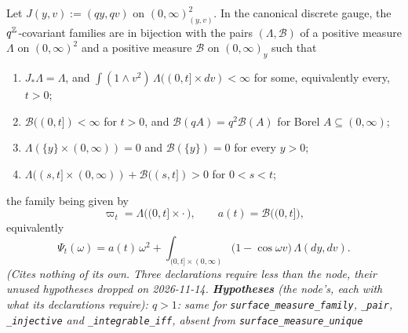 \begin{theorem}
\label{thm:surface-measure}
\leanok
{}
Let $J(y,v) := (qy, qv)$ on $(0,\infty)^2_{(y,v)}$. In the canonical discrete gauge, the
$q^{\mathbb{Z}}$-covariant families are in bijection with the pairs $(\Lambda, \mathcal{B})$ of a positive
measure $\Lambda$ on $(0,\infty)^2$ and a positive measure $\mathcal{B}$ on $(0,\infty)_y$ such that
\begin{enumerate}
\item[(i)] $J_*\Lambda = \Lambda$, and $\int(1 \wedge v^2)\,\Lambda((0,t] \times dv) < \infty$ for
some, equivalently every, $t > 0$;
\item[(ii)] $\mathcal{B}((0,t]) < \infty$ for $t > 0$, and $\mathcal{B}(qA) = q^2\mathcal{B}(A)$ for
Borel $A \subseteq (0,\infty)$;
\item[(iii)] $\Lambda(\{y\} \times (0,\infty)) = 0$ and $\mathcal{B}(\{y\}) = 0$ for every $y > 0$;
\item[(iv)] $\Lambda((s,t] \times (0,\infty)) + \mathcal{B}((s,t]) > 0$ for $0 < s < t$;
\end{enumerate}
the family being given by
\begin{equation}\label{eq:line-e1}
  \varpi_t = \Lambda\bigl((0,t] \times \cdot\,\bigr), \qquad a(t) = \mathcal{B}\bigl((0,t]\bigr),
\end{equation}
equivalently
\begin{equation}\label{eq:line-e2}
  \Psi_t(\omega) = a(t)\,\omega^2 + \int_{(0,t] \times (0,\infty)}\bigl(1 - \cos\omega v\bigr)\,
  \Lambda(dy, dv).
\end{equation}
\statusT\quad\emph{(Cites nothing of its own. Three declarations require less than the node, their
unused hypotheses dropped on 2026-11-14. \textbf{Hypotheses} (the node's, each with what its
declarations require): $q > 1$: same for \texttt{surface\_measure\_family}, \texttt{\_pair},
\texttt{\_injective} and \texttt{\_integrable\_iff}, absent from \texttt{surface\_measure\_unique}
}
\end{theorem}
